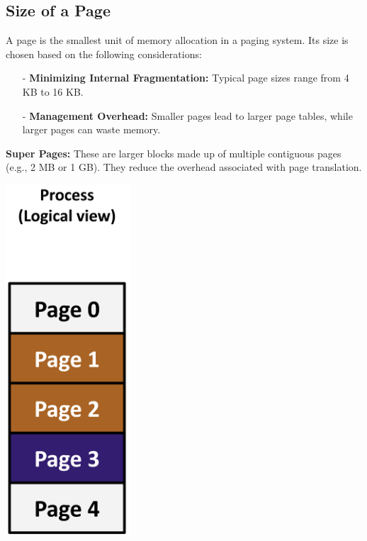 \documentclass[../../compsys.tex]{subfiles}
\begin{document}
\subsection{Size of a Page}
A page is the smallest unit of memory allocation in a paging system. Its size is chosen based on the following considerations:\\
\noindent
\begin{minipage}{0.45\textwidth}
\begin{itemize}
  \item[-] \textbf{Minimizing Internal Fragmentation:} Typical page sizes range from 4 KB to 16 KB.
  \item[-] \textbf{Management Overhead:} Smaller pages lead to larger page tables, while larger pages can waste memory.
\end{itemize}

\textbf{Super Pages:} These are larger blocks made up of multiple contiguous pages (e.g., 2 MB or 1 GB). They reduce the overhead associated with page translation. \\
\end{minipage}%
\hfill
\vline
\hfill
\begin{minipage}{0.45\textwidth}
\begin{center}
  \includegraphics[width=0.35\textwidth]{chapters/L5/images/page-size.png}
\end{center}
\end{minipage}\\
\end{document}
